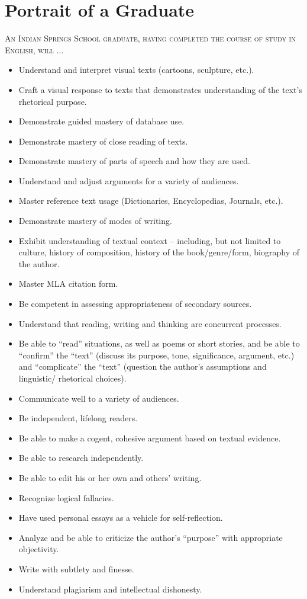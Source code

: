 \section{Portrait of a Graduate}

\textsc{An Indian Springs School graduate, having completed the course of study in English, will} $\ldots$ 
\begin{itemize}\item Understand and interpret visual texts (cartoons, sculpture, etc.).
\item Craft a visual response to texts that demonstrates understanding of the text’s rhetorical purpose.
\item Demonstrate guided mastery of database use.
\item Demonstrate mastery of close reading of texts.
\item Demonstrate mastery of parts of speech and how they are used.
\item Understand and adjust arguments for a variety of audiences.
\item Master reference text usage (Dictionaries, Encyclopedias, Journals, etc.).
\item Demonstrate mastery of modes of writing.
\item Exhibit understanding of textual context – including, but not limited to culture, history of composition, history of the book/genre/form, biography of the author.
\item Master MLA citation form.
\item Be competent in assessing appropriateness of secondary sources.
\item Understand that reading, writing and thinking are concurrent processes.
\item Be able to ``read'' situations, as well as poems or short stories, and be able to ``confirm'' the ``text'' (discuss its purpose, tone, significance, argument, etc.) and ``complicate'' the ``text'' (question the author’s assumptions and linguistic/ rhetorical choices).
\item Communicate well to a variety of audiences.
\item Be independent, lifelong readers.
\item Be able to make a cogent, cohesive argument based on textual evidence.
\item Be able to research independently.
\item Be able to edit his or her own and others’ writing.
\item Recognize logical fallacies.
\item Have used personal essays as a vehicle for self-reflection.
\item Analyze and be able to criticize the author’s ``purpose'' with appropriate objectivity.
\item Write with subtlety and finesse.
\item Understand plagiarism and intellectual dishonesty.
\end{itemize}